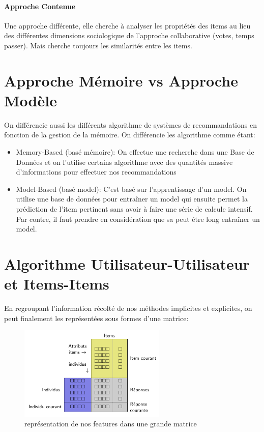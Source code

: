 \documentclass[oneside]{book}
\begin{document}
\paragraph{Approche Contenue}
Une approche différente, elle cherche à analyser les propriétés des items au lieu des différentes dimensions sociologique de l'approche collaborative (votes, temps passer). Mais cherche toujours les similarités entre les items.
\section{Approche Mémoire vs Approche Modèle}
On différencie aussi les différents algorithme de systèmes de recommandations en fonction de la gestion de la mémoire. On différencie les algorithme comme étant:
\begin{itemize}
\item Memory-Based (basé mémoire): On effectue une recherche dans une Base de Données et on l'utilise certains algorithme avec des quantités massive d'informations pour effectuer nos recommandations
\item Model-Based (basé model): C'est basé sur l'apprentissage d'un model. On utilise une base de données pour entraîner un model qui ensuite permet la prédiction de l'item pertinent sans avoir à faire une série de calcule intensif. Par contre, il faut prendre en considération que sa peut être long entraîner un model.
\end{itemize}

\section{Algorithme Utilisateur-Utilisateur et Items-Items}

En regroupant l'information récolté de nos méthodes implicites et explicites, on peut finalement les représentées sous formes d'une matrice:\\

\begin{figure}[!ht]
\centering
\includegraphics[width = 7cm]{matrice_features.png}
\caption{représentation de nos features dans une grande matrice}
\label{fig:matrice_features}
\end{figure}
\end{document}

